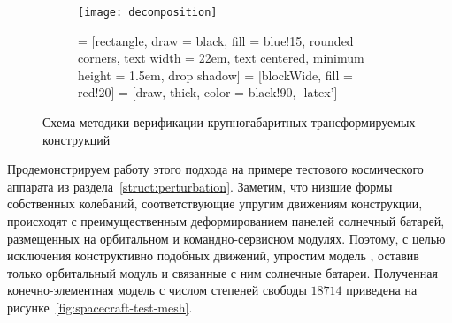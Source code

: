 \begin{figure}[H]
	\centering
	\begin{subfigure}[b]{0.45\textwidth}
		\texttt{[image: decomposition]}
	\end{subfigure}
	\hfill
	\begin{subfigure}[b]{0.45\textwidth}
         = [rectangle, draw = black, fill = blue!15, rounded corners, text width = 22em, text centered, minimum height = 1.5em, drop shadow] 
         = [blockWide, fill = red!20]
         = [draw, thick, color = black!90, -latex'] 
        \scriptsize 
        \def\nodeDist{0.4cm}
	\end{subfigure}
    \caption{Схема методики верификации крупногабаритных трансформируемых конструкций} \label{fig:schemeDecomposition}
\end{figure}

Продемонстрируем работу этого подхода на примере тестового космического аппарата из раздела~\ref{struct:perturbation}. Заметим, что низшие формы собственных колебаний, соответствующие упругим движениям конструкции, происходят с преимущественным деформированием панелей солнечный батарей, размещенных на орбитальном и командно-сервисном модулях. Поэтому, с целью исключения конструктивно подобных движений, упростим модель , оставив только орбитальный модуль и связанные с ним солнечные батареи. Полученная конечно-элементная модель с числом степеней свободы $ 18714 $ приведена на рисунке~\ref{fig:spacecraft-test-mesh}.


